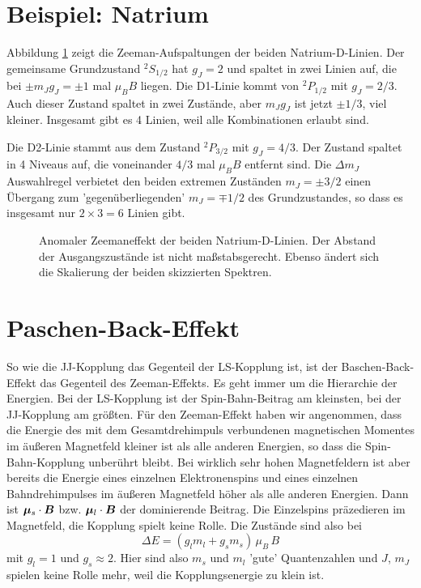 \section{Beispiel: Natrium}

Abbildung \ref{fig:8_natrium_Bfeld} zeigt die Zeeman-Aufspaltungen der beiden Natrium-D-Linien. Der gemeinsame Grundzustand $^2S_{1/2}$ hat $g_J = 2$ und spaltet in zwei Linien auf, die bei $\pm m_J g_J = \pm 1$ mal $\mu_B B$ liegen. Die D1-Linie kommt von $^2P_{1/2}$ mit $g_J = 2/3$. Auch dieser Zustand spaltet in zwei Zustände, aber $m_J  g_J$ ist jetzt $\pm 1/3$, viel kleiner. Insgesamt gibt es 4 Linien, weil alle Kombinationen erlaubt sind.


Die D2-Linie stammt aus dem Zustand $^2P_{3/2}$ mit $g_J = 4/3$. Der Zustand spaltet in 4 Niveaus auf, die voneinander $4/3$ mal $\mu_B B$ entfernt sind. Die $\Delta m_J$ Auswahlregel verbietet den beiden extremen Zuständen $m_J = \pm 3/2$ einen Übergang zum 'gegenüberliegenden' $m_J = \mp 1/2$ des Grundzustandes, so dass es insgesamt nur $2 \times 3 = 6$ Linien gibt.


\begin{figure}
    \caption{Anomaler Zeemaneffekt der beiden Natrium-D-Linien. Der Abstand der Ausgangszustände ist nicht maßstabsgerecht. Ebenso ändert sich die Skalierung der beiden skizzierten Spektren.}
    \label{fig:8_natrium_Bfeld}
\end{figure}


\section{Paschen-Back-Effekt}

So wie die JJ-Kopplung das Gegenteil der LS-Kopplung ist, ist der Baschen-Back-Effekt das Gegenteil des Zeeman-Effekts. Es geht immer um die Hierarchie der Energien. Bei der LS-Kopplung ist der Spin-Bahn-Beitrag am kleinsten, bei der JJ-Kopplung am größten. Für den Zeeman-Effekt haben wir angenommen, dass die Energie des mit dem Gesamtdrehimpuls verbundenen magnetischen Momentes im äußeren Magnetfeld kleiner ist als alle anderen Energien, so dass die Spin-Bahn-Kopplung unberührt bleibt. Bei wirklich sehr hohen Magnetfeldern ist aber bereits die Energie eines einzelnen Elektronenspins und eines einzelnen Bahndrehimpulses im äußeren Magnetfeld höher als alle anderen Energien. Dann ist $ \boldsymbol{\mu}_s \cdot \boldsymbol{B}$ bzw. $ \boldsymbol{\mu}_l \cdot \boldsymbol{B}$ der dominierende Beitrag. Die Einzelspins präzedieren im Magnetfeld, die Kopplung spielt keine Rolle. Die Zustände sind also bei 
\begin{equation}
    \Delta E = \left( g_l m_l + g_s m_s \right) \, \mu_B \, B 
\end{equation}
mit $g_l = 1$ und $g_s \approx 2$. Hier sind also $m_s$ und $m_l$ 'gute' Quantenzahlen und $J$, $m_J$ spielen keine Rolle mehr, weil die Kopplungsenergie zu klein ist.

